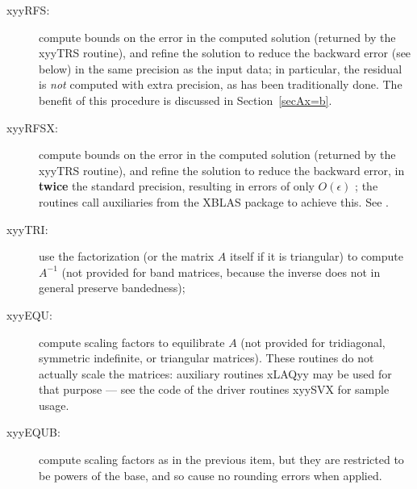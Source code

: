\begin{description}
\item[xyyRFS:] compute bounds on the error in the computed solution (returned
by the xyyTRS routine), and refine the solution to reduce the backward error (see below)
in the same precision as the input data;
in particular, the residual is {\em not} computed with extra precision,
as has been traditionally done.
The benefit of this procedure is discussed in Section~\ref{secAx=b}.

\item[xyyRFSX:] compute bounds on the error in the computed solution (returned
by the xyyTRS routine), and refine the solution to reduce the backward error,
in {\bf twice} the standard precision, resulting in errors of  only $O(\epsilon)$ ;
the routines call auxiliaries from the XBLAS package to achieve this.
See \cite{lietal02, demmeletal06}.

\item[xyyTRI:] use the factorization (or the matrix $A$ itself if it is triangular)
to compute $A^{-1}$ (not provided for band matrices, because the inverse
does not in general preserve bandedness);

\item[xyyEQU:] compute scaling factors to equilibrate $A$
(not provided for tridiagonal, symmetric indefinite, or triangular matrices). 
These routines do not actually scale the matrices: auxiliary routines xLAQyy may be used 
for that purpose ---
see the code of the driver routines xyySVX for sample usage.

\item[xyyEQUB:] compute scaling factors as in the previous item,
but they are restricted to be powers of the base,
and so cause no rounding errors when applied.

\end{description}

